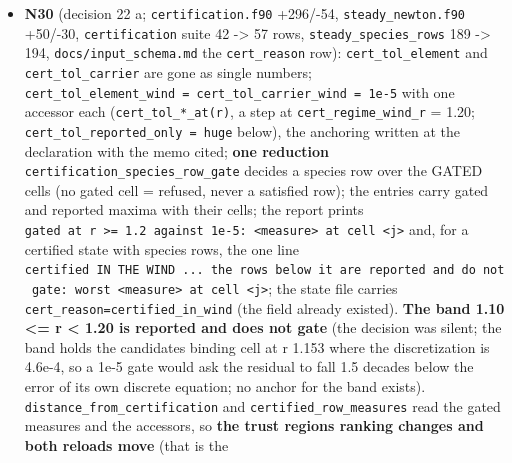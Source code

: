 \documentclass[english,a4paper]{my_memo}
\begin{document}
\begin{itemize}
  of 504 rows, rho 1.0 percent in 4 rows, T 0.5 percent in 2 rows; the \texttt{\_adv}
  measure column 57 percent at one row; \texttt{log10\ Mdot} 7.29). The failing case
  was identified by its own section of the log (the advisor\textquotesingle s first parse
  attributed the summary line to \texttt{hp\_front}, which PASSES). Refreshed:
  \texttt{golden/lower\_profile} archived as \texttt{golden\_pre\_n29\_20260910/lower\_profile},
  \texttt{run\_check.sh\ golden\ lower\_profile} snapshotted the gate\textquotesingle s output, the
  four files compared identical to the case output with the comparator\textquotesingle s
  filter. No other golden touched.
\item
  \textbf{N30} (decision 22 a; \texttt{certification.f90} +296/-54, \texttt{steady\_newton.f90}
  +50/-30, \texttt{certification} suite 42 -\textgreater{} 57 rows, \texttt{steady\_species\_rows} 189 -\textgreater{}
  194, \texttt{docs/input\_schema.md} the \texttt{cert\_reason} row): \texttt{cert\_tol\_element} and
  \texttt{cert\_tol\_carrier} are gone as single numbers; \texttt{cert\_tol\_element\_wind\ =\ cert\_tol\_carrier\_wind\ =\ 1e-5} with one accessor each (\texttt{cert\_tol\_*\_at(r)}, a
  step at \texttt{cert\_regime\_wind\_r} = 1.20; \texttt{cert\_tol\_reported\_only\ =\ huge} below),
  the anchoring written at the declaration with the memo cited; \textbf{one
  reduction} \texttt{certification\_species\_row\_gate} decides a species row over
  the GATED cells (no gated cell = refused, never a satisfied row); the
  entries carry gated and reported maxima with their cells; the report
  prints \texttt{gated\ at\ r\ \textgreater{}=\ 1.2\ against\ 1e-5:\ \textless{}measure\textgreater{}\ at\ cell\ \textless{}j\textgreater{}} and, for a
  certified state with species rows, the one line \texttt{certified\ IN\ THE\ WIND\ ...\ the\ rows\ below\ it\ are\ reported\ and\ do\ not\ gate:\ worst\ \textless{}measure\textgreater{}\ at\ cell\ \textless{}j\textgreater{}}; the state file carries \texttt{cert\_reason=certified\_in\_wind} (the field
  already existed). \textbf{The band 1.10 \textless= r \textless{} 1.20 is reported and does not
  gate} (the decision was silent; the band holds the candidates\textquotesingle{} binding
  cell at r 1.153 where the discretization is 4.6e-4, so a 1e-5 gate would
  ask the residual to fall 1.5 decades below the error of its own discrete
  equation; no anchor for the band exists). \texttt{distance\_from\_certification}
  and \texttt{certified\_row\_measures} read the gated measures and the accessors, so
  \textbf{the trust region\textquotesingle s ranking changes and both reloads move} (that is the

\end{itemize}
\end{document}
